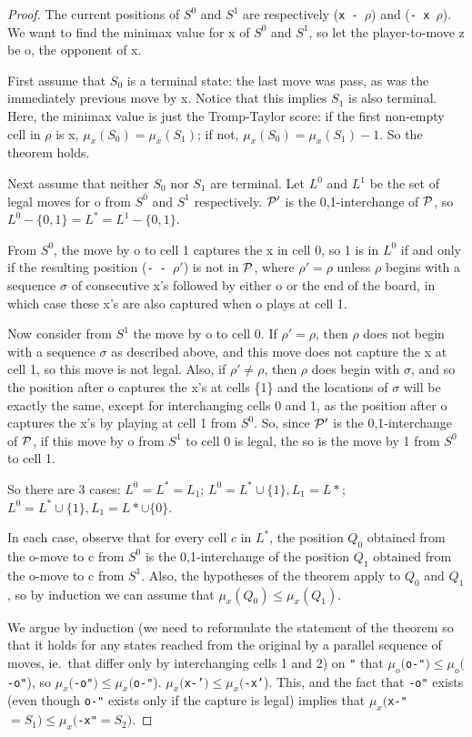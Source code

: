 \begin{proof}
The current positions of $S^0$ and $S^1$ are respectively
({\tt x - }$\rho$) and ({\tt - x }$\rho$).
We want to find the minimax value for x of $S^0$ and $S^1$,
so let the player-to-move z be o, the opponent of x. 

First assume that $S_0$ is a terminal state:
the last move was pass, as was the immediately previous move by x.
Notice that this implies $S_1$ is also terminal.
Here, the minimax value is just the Tromp-Taylor score:
if the first non-empty cell in $\rho$ is x, $\mu_x(S_0)=\mu_x(S_1)$;
if not, $\mu_x(S_0) = \mu_x(S_1) - 1$.
So the theorem holds.

Next assume that neither $S_0$ nor $S_1$ are terminal.
Let $L^0$ and $L^1$
be the set of legal moves for o from $S^0$ and $S^1$ respectively.
${\mathcal{P}}'$ is the 0,1-interchange of ${\mathcal{P}}$,
so $L^0 - \{0,1\} = L^* = L^1 - \{0,1\}$.

From $S^0$,
the move by o to cell 1 captures the x in cell 0,
so 1 is in $L^0$ if and only if the resulting position
({\tt - - }$\rho'$) is not in ${\mathcal{P}}$,
where $\rho' = \rho$ unless $\rho$ begins with a sequence
$\sigma$ of consecutive x's followed by either o or the end of the board,
in which case these x's are also captured when o plays at cell 1.

Now consider from $S^1$ the move by o to cell 0.
If $\rho' = \rho$, then $\rho$ does not begin with a sequence $\sigma$
as described above, and this move does not capture the x
at cell 1, so this move is not legal.
Also, if $\rho' \neq \rho$, then
$\rho$ does begin with $\sigma$,
and so the position after o captures the x's at cells \{1\} 
and the locations of $\sigma$ will be exactly the same,
except for interchanging cells 0 and 1,
as the position after o captures the x's by playing at cell 1 from $S^0$.
So, since ${\mathcal{P}}'$ is the 0,1-interchange of ${\mathcal{P}}$,
if this move by o from $S^1$ to cell 0 is legal,
the so is the move by 1 from $S^0$ to cell 1.

So there are 3 cases:
$L^0 = L^* = L_1$;
$L^0 = L^* \cup \{1\}, L_1 = L*$;
$L^0 = L^* \cup \{1\}, L_1 = L* \cup \{0\}$.

In each case, observe that for every cell $c$ in $L^*$,
the position $Q_0$ obtained from the o-move to c from $S^0$ 
is the 0,1-interchange of 
the position $Q_1$ obtained from the o-move to c from $S^1$.
Also, the hypotheses of the theorem apply to $Q_0$ and $Q_1$,
so by induction we can assume that
$\mu_x(Q_0) \leq \mu_x(Q_1)$.

We argue by induction 
(we need to reformulate the statement of the theorem so
that it holds for any states reached from the original
by a parallel sequence of moves, ie.\ that differ only
by interchanging cells 1 and 2)
on {\tt "} that
$\mu_o(${\tt o-"}$) \leq \mu_o(${\tt -o"}), so
$\mu_x(${\tt -o"}$) \leq \mu_x(${\tt o-"}).
$\mu_x(${\tt x-'}$) \leq \mu_x(${\tt -x'}).
This, and the fact that {\tt -o"} exists (even though {\tt o-"} exists
only if the capture is legal)
implies that $\mu_x(${\tt x-"}$=S_1) \leq \mu_x(${\tt -x"}$=S_2)$.
\end{proof}
\vfill~
